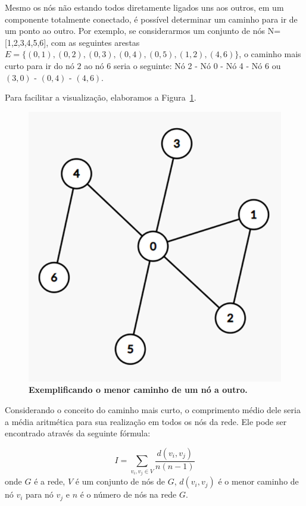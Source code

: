 \documentclass[
12pt,        %
oneside,     %
a4paper,     %
english,       %
brazil        %
%
%
]{ppgca}
\begin{document}
Mesmo os nós não estando todos diretamente ligados uns aos outros, em um componente totalmente conectado, é possível determinar um caminho para ir de um ponto ao outro. Por exemplo, se considerarmos um conjunto de nós N=[1,2,3,4,5,6], com as seguintes arestas $E = \{(0, 1),(0, 2),(0, 3),(0, 4),(0, 5),(1, 2),(4, 6) \}$, o caminho mais curto para ir do nó $2$ ao nó $6$ seria o seguinte: Nó 2 - Nó 0 - Nó 4 - Nó 6 ou $(3, 0)$ - $(0, 4)$ - $(4, 6)$. 

Para facilitar a visualização, elaboramos a Figura~\ref{fig:menorcaminho}.

\begin{figure}[H]
    \includegraphics{menorcaminho.png}
    \centering
    \caption{\textbf{Exemplificando o menor caminho de um nó a outro.}}
    \label{fig:menorcaminho}
\end{figure}

Considerando o conceito do caminho mais curto, o comprimento médio dele seria a média aritmética para sua realização em todos os nós da rede. Ele pode ser encontrado através da seguinte fórmula:


\begin{equation}
    {I} =\sum_{v_i, v_j\in V}\frac{d(v_i, v_j)}{n(n-1)}
\end{equation}
onde $G$ é a rede, $V$ é um conjunto de nós de $G$, $d(v_i, v_j)$ é o menor caminho de nó $v_i$ para nó $v_j$ e $n$ é o número de nós na rede $G$.
\end{document}
